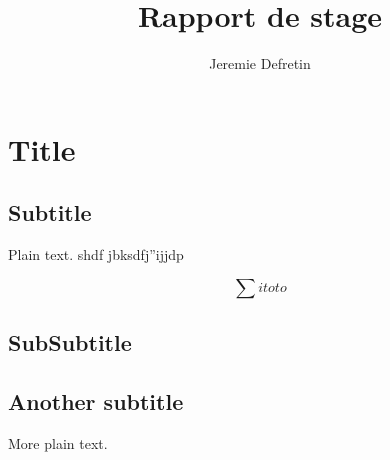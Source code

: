\documentclass{article}
\title{Rapport de stage}
\author{Jeremie Defretin}
\begin{document}
 
\maketitle

\section{Title}

\subsection{Subtitle}

Plain text. shdf jbksdfj''ijjdp

$$ \sum{i}{toto} $$

\subsection{SubSubtitle}


\subsection{Another subtitle}

More plain text.
\end{document}
